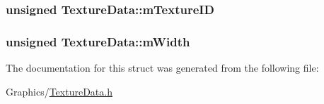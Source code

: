 \subsubsection[{\texorpdfstring{m\+Texture\+ID}{mTextureID}}]{\setlength{\rightskip}{0pt plus 5cm}unsigned Texture\+Data\+::m\+Texture\+ID}\hypertarget{structTextureData_adb8059da9b65ccf8a9c57ca1fbd95af3}{}\label{structTextureData_adb8059da9b65ccf8a9c57ca1fbd95af3}
\subsubsection[{\texorpdfstring{m\+Width}{mWidth}}]{\setlength{\rightskip}{0pt plus 5cm}unsigned Texture\+Data\+::m\+Width}\hypertarget{structTextureData_a7c89cbb86be58809855fcd29c02214c5}{}\label{structTextureData_a7c89cbb86be58809855fcd29c02214c5}


The documentation for this struct was generated from the following file\+:\begin{DoxyCompactItemize}
\item 
Graphics/\hyperlink{TextureData_8h}{Texture\+Data.\+h}\end{DoxyCompactItemize}
